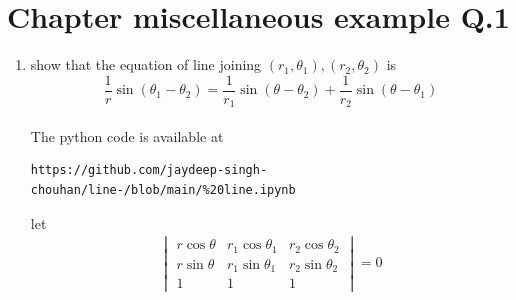\documentclass[journal,12pt,twocolumn]{IEEEtran}
\renewcommand\thesection{\arabic{section}}
\begin{document}
\section{ Chapter   miscellaneous example  Q.1}
\renewcommand{\theequation}{\theenumi}
\begin{enumerate}[label=\thesection.\arabic*.,ref=\thesection.\theenumi]
\item show that the equation of line joining $(r_1,\theta_1),(r_2,\theta_2)$
is $$ \frac{1}{r} \sin{(\theta_1-\theta_2)}=\frac{1}{r_1} \sin{(\theta-\theta_2)}+\frac{1}{r_2} \sin{(\theta-\theta_1)}$$\\
\solution
The python code is available at
 \begin{lstlisting}
https://github.com/jaydeep-singh-chouhan/line-/blob/main/%20line.ipynb
\end{lstlisting}
let \begin{align}
    \begin{vmatrix}
    r\cos\theta&r_1\cos\theta_1&r_2\cos\theta_2\\
    r\sin\theta&r_1\sin\theta_1&r_2\sin\theta_2\\
    1&1&1
    \end{vmatrix}
    =0
\end{align}


\end{enumerate}
\end{document}
